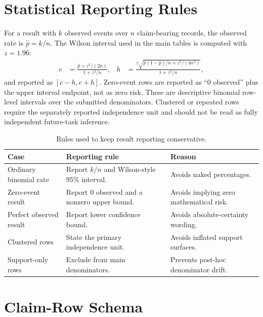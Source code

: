 \section{Statistical Reporting Rules}

For a result with $k$ observed events over $n$ claim-bearing records, the observed rate is $\hat{p}=k/n$. The Wilson interval used in the main tables is computed with $z=1.96$:
\begin{align}
  c &= \frac{\hat{p}+z^2/(2n)}{1+z^2/n},&
  h &= \frac{z\sqrt{\hat{p}(1-\hat{p})/n+z^2/(4n^2)}}{1+z^2/n},
\end{align}
and reported as $[c-h,c+h]$. Zero-event rows are reported as ``0 observed'' plus the upper interval endpoint, not as zero risk. These are descriptive binomial row-level intervals over the submitted denominators. Clustered or repeated rows require the separately reported independence unit and should not be read as fully independent future-task inference.

\begin{table}[htbp]
\centering
\caption{Rules used to keep result reporting conservative.}
\label{tab:stat-reporting-rules}
\tighttable
\begin{tabularx}{\textwidth}{@{}L{2.25cm}YY@{}}
\toprule
Case & Reporting rule & Reason \\
\midrule
Ordinary binomial rate & Report $k/n$ and Wilson-style 95\% interval. & Avoids naked percentages. \\
Zero-event result & Report 0 observed and a nonzero upper bound. & Avoids implying zero mathematical risk. \\
Perfect observed result & Report lower confidence bound. & Avoids absolute-certainty wording. \\
Clustered rows & State the primary independence unit. & Avoids inflated support surfaces. \\
Support-only rows & Exclude from main denominators. & Prevents post-hoc denominator drift. \\
\bottomrule
\end{tabularx}
\end{table}

\section{Claim-Row Schema}

